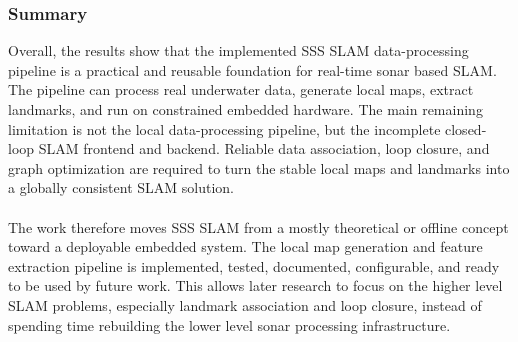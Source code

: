 \subsubsection{Summary}
Overall, the results show that the implemented SSS SLAM data-processing pipeline is a practical and reusable foundation for real-time sonar based SLAM. The pipeline can process real underwater data, generate local maps, extract landmarks, and run on constrained embedded hardware. The main remaining limitation is not the local data-processing pipeline, but the incomplete closed-loop SLAM frontend and backend. Reliable data association, loop closure, and graph optimization are required to turn the stable local maps and landmarks into a globally consistent SLAM solution.
\\ \\
The work therefore moves SSS SLAM from a mostly theoretical or offline concept toward a deployable embedded system. The local map generation and feature extraction pipeline is implemented, tested, documented, configurable, and ready to be used by future work. This allows later research to focus on the higher level SLAM problems, especially landmark association and loop closure, instead of spending time rebuilding the lower level sonar processing infrastructure.
